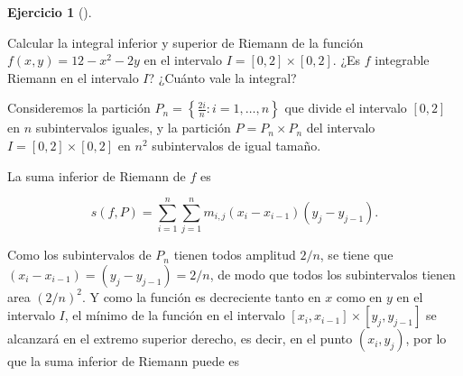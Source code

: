 \documentclass[
  a4paper,
]{scrreport}
\theoremstyle{definition}
\newtheorem{exercise}{Ejercicio}[chapter]
\theoremstyle{remark}
\begin{document}
\begin{exercise}[]\protect\hypertarget{exr-integral-inferior-superior-riemann-n-dimensional}{}\label{exr-integral-inferior-superior-riemann-n-dimensional}

Calcular la integral inferior y superior de Riemann de la función
\(f(x,y)=12-x^2-2y\) en el intervalo \(I=[0,2]\times[0,2]\). ¿Es \(f\)
integrable Riemann en el intervalo \(I\)? ¿Cuánto vale la integral?

\end{exercise}

\begin{tcolorbox}[enhanced jigsaw, left=2mm, coltitle=black, colbacktitle=quarto-callout-tip-color!10!white, opacitybacktitle=0.6, colback=white, breakable, titlerule=0mm, toptitle=1mm, rightrule=.15mm, bottomtitle=1mm, bottomrule=.15mm, toprule=.15mm, leftrule=.75mm, arc=.35mm, opacityback=0, title=\textcolor{quarto-callout-tip-color}{\faLightbulb}\hspace{0.5em}{Solución}, colframe=quarto-callout-tip-color-frame]

Consideremos la partición
\(P_n = \left\{\frac{2i}{n}: i=1,\ldots,n\right\}\) que divide el
intervalo \([0,2]\) en \(n\) subintervalos iguales, y la partición
\(P=P_n\times P_n\) del intervalo \(I=[0,2]\times[0,2]\) en \(n^2\)
subintervalos de igual tamaño.

La suma inferior de Riemann de \(f\) es

\[
s(f,P) = \sum_{i=1}^n\sum_{j=1}^n m_{i,j} (x_i-x_{i-1})(y_j-y_{j-1}).
\]

Como los subintervalos de \(P_n\) tienen todos amplitud \(2/n\), se
tiene que \((x_i-x_{i-1}) = (y_j-y_{j-1}) = 2/n\), de modo que todos los
subintervalos tienen area \((2/n)^2\). Y como la función es decreciente
tanto en \(x\) como en \(y\) en el intervalo \(I\), el mínimo de la
función en el intervalo \([x_i,x_{i-1}]\times[y_j,y_{j-1}]\) se
alcanzará en el extremo superior derecho, es decir, en el punto
\((x_i,y_j)\), por lo que la suma inferior de Riemann puede es


\end{tcolorbox}
\end{document}
